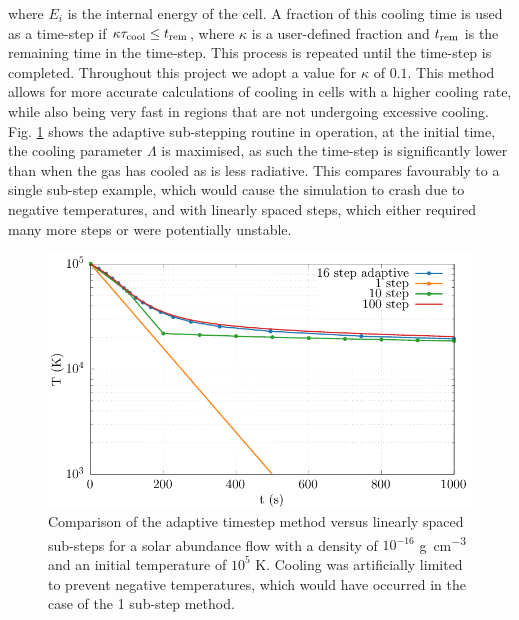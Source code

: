 \noindent
where $E_i$ is the internal energy of the cell.
A fraction of this cooling time is used as a time-step if $\kappa \tau_\text{cool} \leq t_\text{rem}$, where $\kappa$ is a user-defined fraction and $t_\text{rem}$ is the remaining time in the time-step.
This process is repeated until the time-step is completed.
Throughout this project we adopt a value for $\kappa$ of $0.1$.
This method allows for more accurate calculations of cooling in cells with a higher cooling rate, while also being very fast in regions that are not undergoing excessive cooling.
Fig. \ref{fig:cooling-loop-evolution} shows the adaptive sub-stepping routine in operation, at the initial time, the cooling parameter $\Lambda$ is maximised, as such the time-step is significantly lower than when the gas has cooled as is less radiative.
This compares favourably to a single sub-step example, which would cause the simulation to crash due to negative temperatures, and with linearly spaced steps, which either required many more steps or were potentially unstable.

\begin{figure}[ht]
  \centering
  \includegraphics{assets/plasma-cooling-benchmarks/evolution.pdf}
  \caption[Cooling sub-step method evolution comparison]{Comparison of the adaptive timestep method versus linearly spaced sub-steps for a solar abundance flow with a density of $10^{-16}$ \si{\gram\per\centi\metre\cubed} and an initial temperature of $10^5$ \si{\kelvin}. Cooling was artificially limited to prevent negative temperatures, which would have occurred in the case of the 1 sub-step method.}
  \label{fig:cooling-loop-evolution}
\end{figure}

